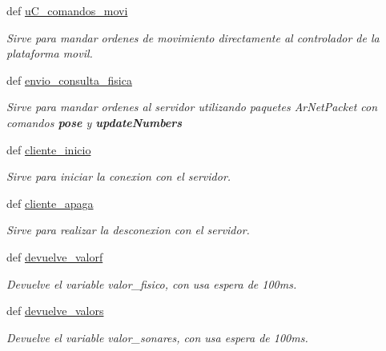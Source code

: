 \begin{DoxyCompactItemize}
def \hyperlink{classcliente__lib__original_1_1cliente__lib_a16a11ee4bc738ae83b652343583ad556}{uC\_\-comandos\_\-movi}
\begin{DoxyCompactList}\small\item\em Sirve para mandar ordenes de movimiento directamente al controlador de la plataforma movil. \end{DoxyCompactList}\item 
def \hyperlink{classcliente__lib__original_1_1cliente__lib_a10ab9f40fbd7244e96c2b2493e9a9e86}{envio\_\-consulta\_\-fisica}
\begin{DoxyCompactList}\small\item\em Sirve para mandar ordenes al servidor utilizando paquetes ArNetPacket con comandos {\bfseries pose} y {\bfseries updateNumbers} \end{DoxyCompactList}\item 
def \hyperlink{classcliente__lib__original_1_1cliente__lib_a52e3e1ca7b1935b7fb7e6f0a093918e9}{cliente\_\-inicio}
\begin{DoxyCompactList}\small\item\em Sirve para iniciar la conexion con el servidor. \end{DoxyCompactList}\item 
def \hyperlink{classcliente__lib__original_1_1cliente__lib_a9ea49590b5ca6de4f6368f2209a9ac0e}{cliente\_\-apaga}
\begin{DoxyCompactList}\small\item\em Sirve para realizar la desconexion con el servidor. \end{DoxyCompactList}\item 
def \hyperlink{classcliente__lib__original_1_1cliente__lib_ae6a834b4525e77e3f88f6eaa68ae97eb}{devuelve\_\-valorf}
\begin{DoxyCompactList}\small\item\em Devuelve el variable valor\_\-fisico, con usa espera de 100ms. \end{DoxyCompactList}\item 
def \hyperlink{classcliente__lib__original_1_1cliente__lib_a5766042b7c5c2bd3b291c02141af8824}{devuelve\_\-valors}
\begin{DoxyCompactList}\small\item\em Devuelve el variable valor\_\-sonares, con usa espera de 100ms. \end{DoxyCompactList}\end{DoxyCompactItemize}
